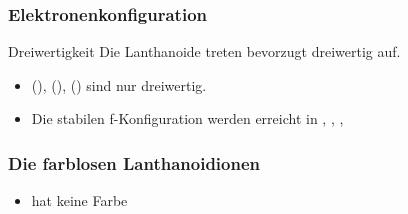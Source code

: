 \documentclass{beamer}
\begin{document}
\begin{frame}[t]\frametitle{Elektronenkonfiguration}

\begin{beamerboxesrounded}[shadow=true]{Dreiwertigkeit}
  Die Lanthanoide treten bevorzugt dreiwertig auf.
\end{beamerboxesrounded}
     \begin{table}
      \centering
{}
\end{table}

    \begin{itemize}
      \item {} (),  (),  () sind nur dreiwertig.
      \item Die stabilen f-Konfiguration werden erreicht in , , ,
    \end{itemize}
\end{frame}



  \begin{frame}[t]\frametitle{ Die farblosen Lanthanoidionen }
  \begin{beamerboxesrounded}[shadow=false]{}
  \begin{itemize}
  \item {} hat keine Farbe
  \end{itemize}
    \end{beamerboxesrounded}
  \end{frame}

\end{document}
